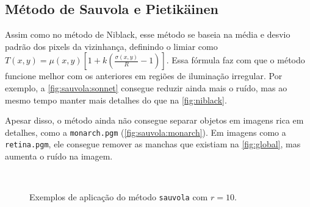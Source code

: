 \subsection{Método de Sauvola e Pietikäinen}

Assim como no método de Niblack, esse método se baseia na média e desvio padrão dos pixels da vizinhança, definindo o limiar como $T(x, y) = \mu(x, y) \left[1 + k \left(\frac{\sigma(x, y)}{R} - 1\right)\right]$. Essa fórmula faz com que o método funcione melhor com os anteriores em regiões de iluminação irregular. Por exemplo, a \cref{fig:sauvola:sonnet} consegue reduzir ainda mais o ruído, mas ao mesmo tempo manter mais detalhes do que na \cref{fig:niblack}.

Apesar disso, o método ainda não consegue separar objetos em imagens rica em detalhes, como a \texttt{monarch.pgm} (\cref{fig:sauvola:monarch}). Em imagens como a \texttt{retina.pgm}, ele consegue remover as manchas que existiam na \cref{fig:global}, mas aumenta o ruído na imagem.

\begin{figure}[H]
    \centering
    \\[8pt]

    \caption{Exemplos de aplicação do método \texttt{sauvola} com $r = 10$.}
    \label{fig:sauvola}
\end{figure}